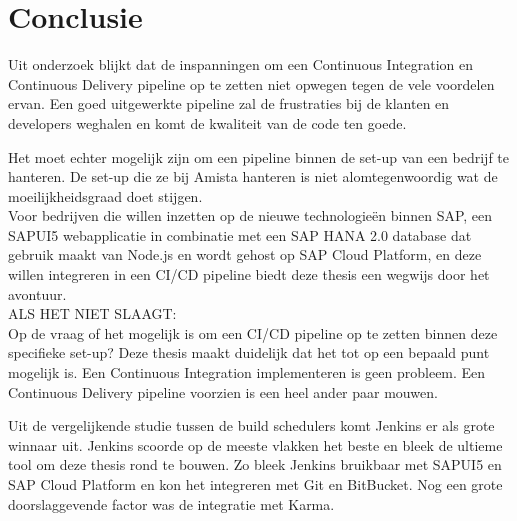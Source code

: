 
\chapter{Conclusie}
\label{ch:conclusie}



Uit onderzoek blijkt dat de inspanningen om een Continuous Integration en Continuous Delivery pipeline op te zetten niet opwegen tegen de vele voordelen ervan. Een goed uitgewerkte pipeline zal de frustraties bij de klanten en developers weghalen en komt de kwaliteit van de code ten goede.

Het moet echter mogelijk zijn om een pipeline binnen de set-up van een bedrijf te hanteren. De set-up die ze bij Amista hanteren is niet alomtegenwoordig wat de moeilijkheidsgraad doet stijgen. \\
Voor bedrijven die willen inzetten op de nieuwe technologieën binnen SAP, een SAPUI5 webapplicatie in combinatie met een SAP HANA 2.0 database dat gebruik maakt van Node.js en wordt gehost op SAP Cloud Platform, en deze willen integreren in een CI/CD pipeline biedt deze thesis een wegwijs door het avontuur.\\

ALS HET NIET SLAAGT:\\
Op de vraag of het mogelijk is om een CI/CD pipeline op te zetten binnen deze specifieke set-up? Deze thesis maakt duidelijk dat het tot op een bepaald punt mogelijk is. Een Continuous Integration implementeren is geen probleem. Een Continuous Delivery pipeline voorzien is een heel ander paar mouwen.

Uit de vergelijkende studie tussen de build schedulers komt Jenkins er als grote winnaar uit. Jenkins scoorde op de meeste vlakken het beste en bleek de ultieme tool om deze thesis rond te bouwen. Zo bleek Jenkins bruikbaar met SAPUI5 en SAP Cloud Platform en kon het integreren met Git en BitBucket. Nog een grote doorslaggevende factor was de integratie met Karma.

